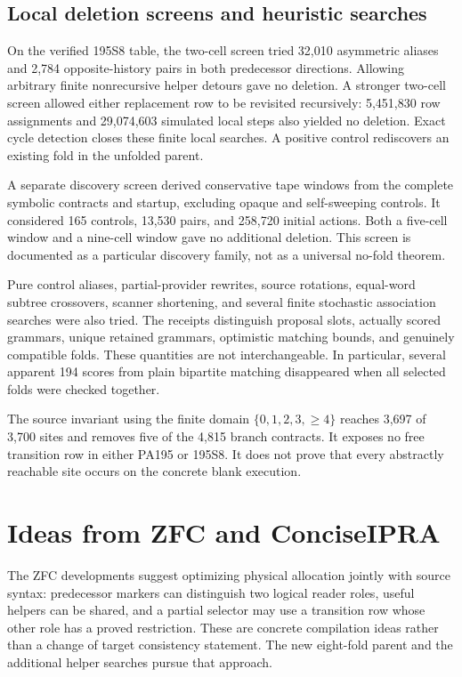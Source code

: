 \documentclass[11pt,letterpaper]{article}
\begin{document}
\subsection{Local deletion screens and heuristic searches}
On the verified 195S8 table, the two-cell screen tried 32,010 asymmetric
aliases and 2,784 opposite-history pairs in both predecessor directions.
Allowing arbitrary finite nonrecursive helper detours gave no deletion.
A stronger two-cell screen allowed either replacement row to be
revisited recursively: 5,451,830 row assignments and 29,074,603
simulated local steps also yielded no deletion. Exact cycle detection
closes these finite local searches. A positive control rediscovers an
existing fold in the unfolded parent.

A separate discovery screen derived conservative tape windows from
the complete symbolic contracts and startup, excluding opaque and
self-sweeping controls. It considered 165 controls, 13,530 pairs,
and 258,720 initial actions. Both a five-cell window and a nine-cell
window gave no additional deletion. This screen is documented as
a particular discovery family, not as a universal no-fold theorem.

Pure control aliases, partial-provider rewrites, source rotations,
equal-word subtree crossovers, scanner shortening, and several finite
stochastic association searches were also tried.
The receipts distinguish proposal slots, actually scored grammars,
unique retained grammars, optimistic matching bounds, and genuinely
compatible folds. These quantities are not interchangeable.
In particular, several apparent 194 scores from plain bipartite
matching disappeared when all selected folds were checked together.

The source invariant using the finite domain
$\{0,1,2,3,\ge4\}$ reaches 3,697 of 3,700 sites and removes five
of the 4,815 branch contracts. It exposes no free transition row
in either PA195 or 195S8. It does not prove that every abstractly
reachable site occurs on the concrete blank execution.



\section{Ideas from ZFC and ConciseIPRA}
\label{sec:ideas}
The ZFC developments suggest optimizing physical allocation jointly
with source syntax: predecessor markers can distinguish two logical
reader roles, useful helpers can be shared, and a partial selector may
use a transition row whose other role has a proved restriction.
These are concrete compilation ideas rather than a change of target
consistency statement. The new eight-fold parent and the additional
helper searches pursue that approach.
\end{document}
